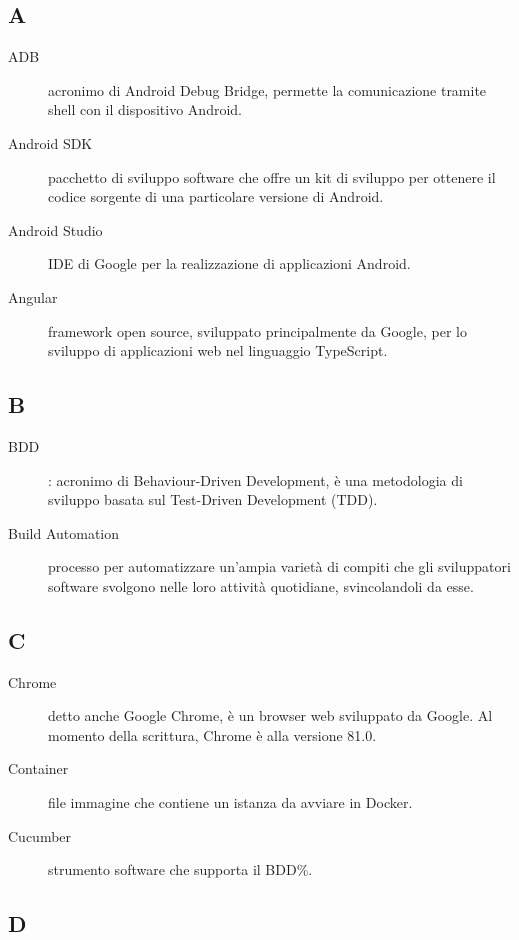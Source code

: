 \documentclass[../../../manuale.sviluppatore.tex]{subfiles}
\begin{document}
\subsection{A}

\begin{description}
    \item[ADB] acronimo di Android Debug Bridge, permette la comunicazione tramite shell con il dispositivo Android.
    \item[Android SDK] pacchetto di sviluppo software che offre un kit di sviluppo per ottenere il codice sorgente di una particolare versione di Android.
    \item[Android Studio] IDE di Google per la realizzazione di applicazioni Android.
    \item[Angular] framework open source, sviluppato principalmente da Google, per lo sviluppo di applicazioni web nel linguaggio TypeScript.
\end{description}

\subsection{B}
\begin{description}
    \item[BDD]: acronimo di Behaviour-Driven Development, è una metodologia di sviluppo basata sul Test-Driven Development (TDD).
    \item[Build Automation] processo per automatizzare un'ampia varietà di compiti che gli sviluppatori software svolgono nelle loro attività quotidiane, svincolandoli da esse.
\end{description}

\subsection{C}

\begin{description}
    \item[Chrome] detto anche Google Chrome, è un browser web sviluppato da Google. Al momento della scrittura, Chrome è alla versione 81.0.
    \item[Container] file immagine che contiene un istanza da avviare in Docker.
    \item[Cucumber] strumento software che supporta il BDD\%.
\end{description}

\subsection{D}
\end{document}
